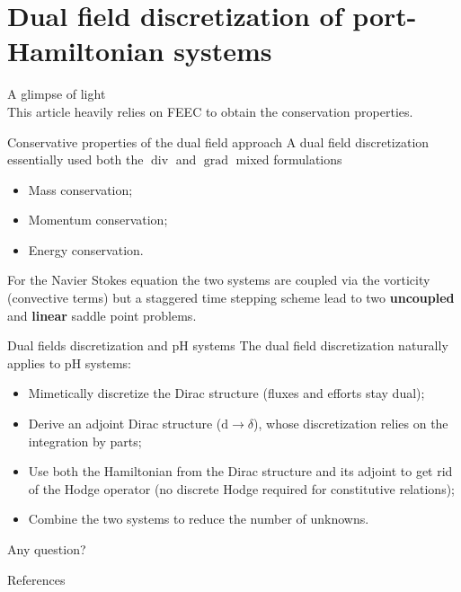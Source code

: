 \documentclass[aspectratio=169]{beamer}
\DeclareMathOperator*{\grad}{grad}
\renewcommand{\div}{\operatorname{div}}
\begin{document}
\section{Dual field discretization of port-Hamiltonian systems}

\begin{frame}{A glimpse of light}
	\\
	\vspace{.5cm}
	This article heavily relies on FEEC to obtain the conservation properties.
	\begin{block}{Conservative properties of the dual field approach}
		A dual field discretization essentially used both the $\div$ and $\grad$ mixed formulations
		\begin{itemize}
			\item[\textcolor{green}{\checkmark}] Mass conservation;
			\item[\textcolor{green}{\checkmark}] Momentum conservation;
			\item[\textcolor{green}{\checkmark}] Energy conservation.
		\end{itemize}
		For the Navier Stokes equation the two systems are coupled via the vorticity (convective terms) but a staggered time stepping scheme lead to two \textbf{uncoupled} and \textbf{linear} saddle point problems.
	\end{block}
	
\end{frame}

\begin{frame}{Dual fields discretization and pH systems}
	The dual field discretization naturally applies to pH systems:
	\begin{itemize}
		\item<2-> Mimetically discretize the Dirac structure (fluxes and efforts stay dual);
		\item<3-> Derive an adjoint Dirac structure ($\mathrm{d} \rightarrow \delta$), whose discretization relies on the integration by parts;
		\item<4-> Use both the Hamiltonian from the Dirac structure and its adjoint to get rid of the Hodge operator (no discrete Hodge required for constitutive relations);
		\item<5-> Combine the two systems to reduce the number of unknowns.
	\end{itemize}
\end{frame}

\begin{frame}
	\Large Any question?
\end{frame}

\begin{frame}[allowframebreaks]{References}
	\printbibliography
\end{frame}
\end{document}
